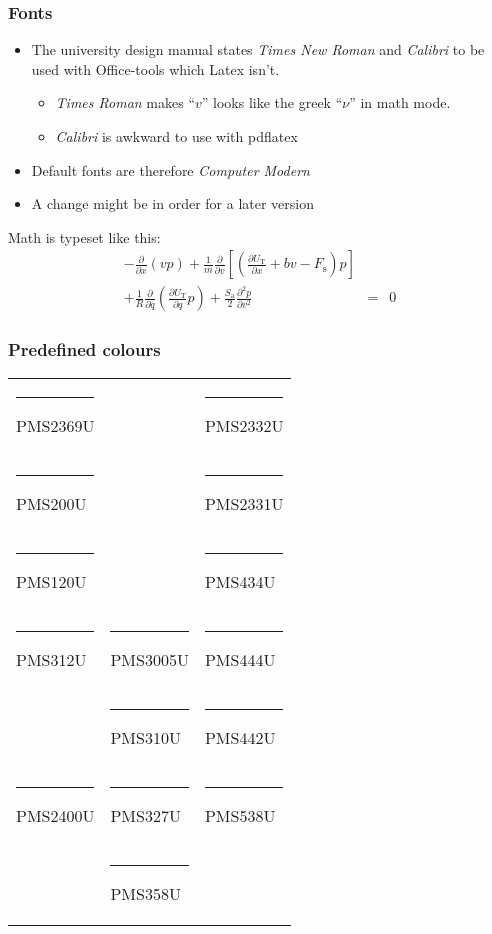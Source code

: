 \documentclass[aspectratio=169]{beamer}
\begin{document}
\begin{frame}
\frametitle{Fonts}
\begin{itemize}
\item The university design manual states \textit{Times New Roman} and \textit{Calibri} to be used with Office-tools which Latex isn't.  
\begin{itemize}
\item \textit{Times Roman} makes ``$v$'' looks like the greek ``$\nu$'' in math mode. 
\item \textit{Calibri} is awkward to use with pdflatex 
\end{itemize}
\item Default fonts are therefore \textit{Computer Modern}
\item A change might be in order for a later version 
\end{itemize}
\vspace{5mm}

Math is typeset like this:
\begin{eqnarray}
-\frac{\partial}{\partial x}\left(vp\right)
+\frac{1}{m}\frac{\partial}{\partial v}\left[\left( \frac{\partial U_\mathrm{T}}{\partial x} +bv-F_\mathrm{s}\right)p\right] \nonumber \\
+\frac{1}{R}\frac{\partial}{\partial q}\left( \frac{\partial U_\mathrm{T}}{\partial q}p\right)
+ \frac{S_\mathrm{a}}{2}\frac{\partial^2p}{\partial v^2} & = & 0 \nonumber
\end{eqnarray}
\end{frame}


\begin{frame}
\frametitle{Predefined colours}

\centering

\begin{tabular}{lll}  
  {\color{PMS2369U}\rule{4em}{2ex}} PMS2369U & &  {\color{PMS2332U}\rule{4em}{2ex}} PMS2332U \\
  {\color{PMS200U}\rule{4em}{2ex}} PMS200U &  &  {\color{PMS2331U}\rule{4em}{2ex}} PMS2331U \\
  {\color{PMS120U}\rule{4em}{2ex}} PMS120U &  & {\color{PMS434U}\rule{4em}{2ex}} PMS434U \\
  {\color{PMS312U}\rule{4em}{2ex}} PMS312U &  {\color{PMS3005U}\rule{4em}{2ex}} PMS3005U & {\color{PMS444U}\rule{4em}{2ex}}  PMS444U \\ 
   &   {\color{PMS310U}\rule{4em}{2ex}} PMS310U & {\color{PMS442U}\rule{4em}{2ex}}  PMS442U \\ 
  {\color{PMS2400U}\rule{4em}{2ex}} PMS2400U &  {\color{PMS327U}\rule{4em}{2ex}} PMS327U & {\color{PMS538U}\rule{4em}{2ex}}  PMS538U \\
  &  {\color{PMS358U}\rule{4em}{2ex}} PMS358U  &   
\end{tabular}

\end{frame}
\end{document}
